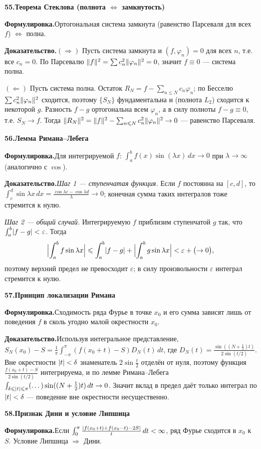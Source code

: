 \documentclass[10pt,a4paper]{article}
\newcommand{\dx}{\,dx}
\newcommand{\dt}{\,dt}
\newcommand{\eps}{\varepsilon}
\renewcommand{\le}{\leqslant}
\DeclarePairedDelimiter{\abs}{\lvert}{\rvert}
\DeclarePairedDelimiter{\norm}{\lVert}{\rVert}
\theoremstyle{definition}
\theoremstyle{plain}
\newcommand{\writespace}{\vspace{7.5mm}}
\newcommand{\prf}[2]{%
  \par\writespace\noindent
  {\large\bfseries\color{accent}#1.\enspace #2}\par\smallskip}
\newcommand{\stmt}{\par\noindent\textbf{Формулировка.}\enspace}
\newcommand{\dok}{\par\noindent\textbf{Доказательство.}\enspace}
\begin{document}
\prf{55}{Теорема Стеклова (полнота $\iff$ замкнутость)}
\stmt Ортогональная система замкнута (равенство Парсеваля для всех $f$) $\iff$ полна.

\dok $(\Rightarrow)$ Пусть система замкнута и $(f,\varphi_n)=0$ для всех $n$, т.е. все $c_n=0$. По
Парсевалю $\norm f^2=\sum c_n^2\norm{\varphi_n}^2=0$, значит $f\equiv0$ — система полна.

$(\Leftarrow)$ Пусть система полна. Остаток $R_N=f-\sum_{n\le N}c_n\varphi_n$; по Бесселю
$\sum c_n^2\norm{\varphi_n}^2$ сходится, поэтому $\{S_N\}$ фундаментальна и (полнота $L_2$) сходится
к некоторой $g$. Разность $f-g$ ортогональна всем $\varphi_n$, а в силу полноты $f-g\equiv0$, т.е.
$S_N\to f$. Тогда $\norm{R_N}^2=\norm f^2-\sum_{n\le N}c_n^2\norm{\varphi_n}^2\to0$ — равенство
Парсеваля.

\prf{56}{Лемма Римана–Лебега}
\stmt Для интегрируемой $f$: $\int_a^b f(x)\sin(\lambda x)\dx\to0$ при $\lambda\to\infty$
(аналогично с $\cos$).

\dok \emph{Шаг 1 — ступенчатая функция.} Если $f$ постоянна на $[c,d]$, то
$\int_c^d\sin\lambda x\dx=\tfrac{\cos\lambda c-\cos\lambda d}{\lambda}\to0$; конечная сумма таких
интегралов тоже стремится к нулю.

\emph{Шаг 2 — общий случай.} Интегрируемую $f$ приблизим
ступенчатой $g$ так, что $\int_a^b\abs{f-g}<\eps$. Тогда
\[
  \abs[\Big]{\int_a^b f\sin\lambda x}\le\int_a^b\abs{f-g}+\abs[\Big]{\int_a^b g\sin\lambda x}
  <\eps+\bigl(\to0\bigr),
\]
поэтому верхний предел не превосходит $\eps$; в силу произвольности $\eps$ интеграл стремится к
нулю.

\prf{57}{Принцип локализации Римана}
\stmt Сходимость ряда Фурье в точке $x_0$ и его сумма зависят лишь от поведения $f$ в сколь угодно
малой окрестности $x_0$.

\dok Используя интегральное представление, $S_N(x_0)-S=\tfrac1\pi\int_{-\pi}^{\pi}(f(x_0+t)-S)D_N(t)\dt$,
где $D_N(t)=\tfrac{\sin((N+\frac12)t)}{2\sin(t/2)}$. Вне окрестности $\abs t<\delta$ знаменатель
$2\sin\tfrac t2$ отделён от нуля, поэтому функция $\tfrac{f(x_0+t)-S}{2\sin(t/2)}$ интегрируема, и по
лемме Римана–Лебега $\int_{\delta\le\abs t\le\pi}(\dots)\sin((N+\tfrac12)t)\dt\to0$. Значит вклад в
предел даёт только интеграл по $\abs t<\delta$ — поведение вне окрестности несущественно.

\prf{58}{Признак Дини и условие Липшица}
\stmt Если $\int_0^\pi\tfrac{\abs{f(x_0+t)+f(x_0-t)-2S}}{t}\dt<\infty$, ряд Фурье сходится в $x_0$ к
$S$. Условие Липшица $\Rightarrow$ Дини.
\end{document}

